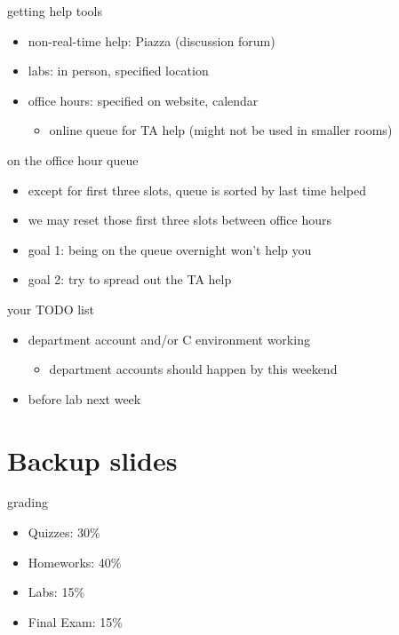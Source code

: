\begin{frame}{getting help tools}
    \begin{itemize}
    \item non-real-time help: Piazza (discussion forum)
    \item labs: in person, specified location
    \item office hours: specified on website, calendar
        \begin{itemize}
        \item online queue for TA help (might not be used in smaller rooms)
        \end{itemize}
    \end{itemize}
\end{frame}

\begin{frame}{on the office hour queue}
    \begin{itemize}
    \item except for first three slots, queue is sorted by last time helped
    \item we may reset those first three slots between office hours
    \vspace{.5cm}
    \item goal 1: being on the queue overnight won't help you
    \item goal 2: try to spread out the TA help
    \end{itemize}
\end{frame}

\begin{frame}{your TODO list}
    \begin{itemize}
    \item department account and/or C environment working
        \begin{itemize}
        \item department accounts should happen by this weekend
        \end{itemize}
    \item before lab next week
    \end{itemize}
\end{frame}

\section{Backup slides}

\begin{frame}{grading}
    \begin{itemize}
    \item Quizzes: 30\%
    \item Homeworks: 40\%
    \item Labs: 15\%
    \item Final Exam: 15\%
    \end{itemize}
\end{frame}

\begin{frame}
\end{frame}
